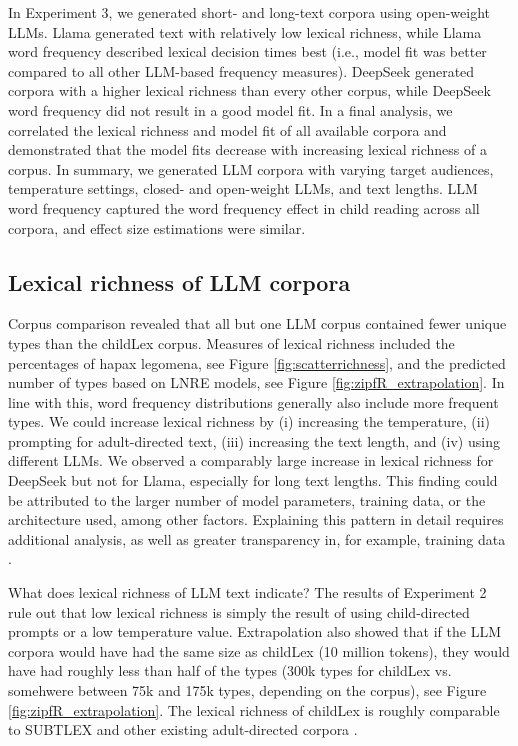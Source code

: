 \documentclass[manuscript]{stjour}
\begin{document}
In Experiment 3, we generated short- and long-text corpora using open-weight LLMs. Llama generated text with relatively low lexical richness, while Llama word frequency described lexical decision times best (i.e., model fit was better compared to all other LLM-based frequency measures). DeepSeek generated corpora with a higher lexical richness than every other corpus, while DeepSeek word frequency did not result in a good model fit. In a final analysis, we correlated the lexical richness and model fit of all available corpora and demonstrated that the model fits decrease with increasing lexical richness of a corpus. In summary, we generated LLM corpora with varying target audiences, temperature settings, closed- and open-weight LLMs, and text lengths. LLM word frequency captured the word frequency effect in child reading across all corpora, and effect size estimations were similar. 


\subsection*{Lexical richness of LLM corpora}

Corpus comparison revealed that all but one LLM corpus contained fewer unique types than the childLex corpus. Measures of lexical richness included the percentages of hapax legomena, see Figure \ref{fig:scatterrichness}, and the predicted number of types based on LNRE models, see Figure \ref{fig:zipfR_extrapolation}. In line with this, word frequency distributions generally also include more frequent types. We could increase lexical richness by (i) increasing the temperature, (ii) prompting for adult-directed text, (iii) increasing the text length, and (iv) using different LLMs. We observed a comparably large increase in lexical richness for DeepSeek but not for Llama, especially for long text lengths. This finding could be attributed to the larger number of model parameters, training data, or the architecture used, among other factors. Explaining this pattern in detail requires additional analysis, as well as greater transparency in, for example, training data \citep{liesenfeld_opening_2023}.

What does lexical richness of LLM text indicate? The results of Experiment 2 rule out that low lexical richness is simply the result of using child-directed prompts or a low temperature value. Extrapolation also showed that if the LLM corpora would have had the same size as childLex (10 million tokens), they would have had roughly less than half of the types (300k types for childLex vs. somehwere between 75k and 175k types, depending on the corpus), see Figure \ref{fig:zipfR_extrapolation}. The lexical richness of childLex is roughly comparable to SUBTLEX and other existing adult-directed corpora \citep{baayen_word_2001}.  
\end{document}
